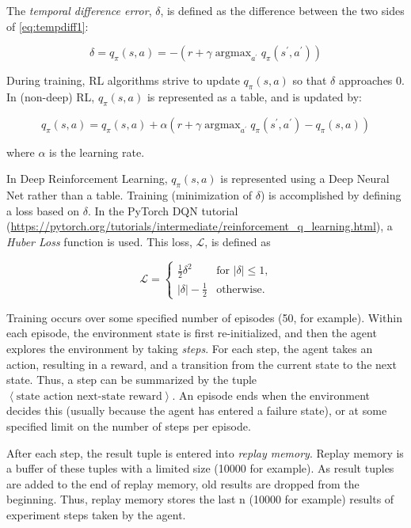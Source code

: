 \documentclass[acmlarge,screen]{acmart}
\DeclareMathOperator*{\argmax}{argmax}
\begin{document}
The \textit{temporal difference error}, $\delta$, is defined as the difference between the two sides of \ref{eq:tempdiff1}:

\begin{equation} \label{eq:tempdiff1}
 \delta =  q_\pi (s,a) = - \left( r + \gamma \argmax_{a^\prime} q_\pi (s^\prime, a^\prime) \right)
\end{equation}

During training, RL algorithms strive to update $q_\pi (s,a)$ so that $\delta$ approaches 0.
In (non-deep) RL, $q_\pi (s,a)$ is represented as a table, and is updated by:

\begin{equation} \label{eq:qupdate}
 q_\pi (s,a) = q_\pi (s,a) + \alpha \left( r + \gamma \argmax_{a^\prime} q_\pi (s^\prime, a^\prime) - q_\pi (s,a) \right)
\end{equation}

\noindent where $\alpha$ is the learning rate.

In Deep Reinforcement Learning, $q_\pi (s,a)$ is represented using a Deep Neural Net rather than a table.
Training (minimization of $\delta$) is accomplished by defining a loss based on $\delta$.
In the PyTorch DQN tutorial (\url{https://pytorch.org/tutorials/intermediate/reinforcement\_q\_learning.html}),
a \textit{Huber Loss} function is used.
This loss, $\mathcal{L}$, is defined as 


\begin{equation}  \label{eq:huberloss}
  \mathcal{L} =
    \begin{cases}
      \frac{1}{2} \delta^2 & \text{for $\lvert \delta \rvert \leq 1$,}\\
      \lvert \delta \rvert - \frac{1}{2} & \text{otherwise.}
    \end{cases}       
\end{equation}

Training occurs over some specified number of episodes (50, for example).
Within each episode, the environment state is first re-initialized, and then the agent explores the environment by taking
\textit{steps}.
For each step, the agent takes an action, resulting in a reward, and a transition from the current state to the next state.
Thus, a step can be summarized by the tuple $\left< \text{state action next-state reward} \right>$.
An episode ends when the environment decides this (usually because the agent has entered a failure state), 
or at some specified limit on the number of steps per episode.

After each step, the result tuple is entered into \textit{replay memory}.  
Replay memory is a buffer of these tuples with a limited size (10000 for example).
As result tuples are added to the end of replay memory, old results are dropped from the beginning.
Thus, replay memory stores the last n (10000 for example) results of experiment steps taken by the agent.
\end{document}
